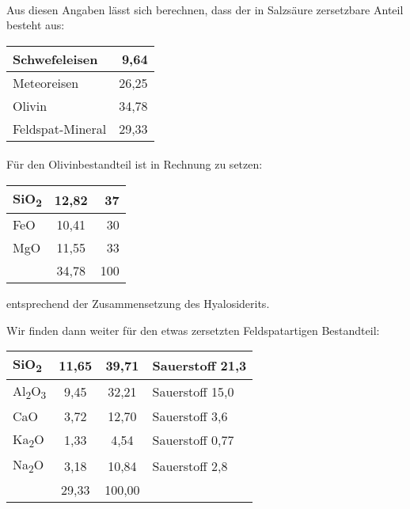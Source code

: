 \documentclass[a4paper, 11pt, oneside]{article}
\begin{document}
\paragraph{}
Aus diesen Angaben lässt sich berechnen, dass der in Salzsäure zersetzbare Anteil besteht aus:
\begin{center}
    \begin{tabular}{ |l|r| } 
    \hline
    Schwefeleisen & 9,64\\\hline
    Meteoreisen & 26,25\\\hline
    Olivin & 34,78\\\hline
    Feldspat-Mineral & 29,33\\
    \hline
    \end{tabular}
\end{center}
\paragraph{}
Für den Olivinbestandteil ist in Rechnung zu setzen:
\begin{center}
    \begin{tabular}{ |l|c|r| } 
    \hline
    SiO\textsubscript{2} & 12,82 & 37\\\hline
    FeO & 10,41 & 30\\\hline
    MgO & 11,55 & 33\\\hline
    & 34,78 & 100\\
    \hline
    \end{tabular}
\end{center}
entsprechend der Zusammensetzung des Hyalosiderits.

Wir finden dann weiter für den etwas zersetzten Feldspatartigen Bestandteil:
\begin{center}
    \begin{tabular}{ |l|c|c|l| } 
    \hline
    SiO\textsubscript{2} & 11,65 & 39,71 & Sauerstoff 21,3\\\hline
    Al\textsubscript{2}O\textsubscript{3} & 9,45 & 32,21 & Sauerstoff 15,0\\\hline
    CaO & 3,72 & 12,70 & Sauerstoff 3,6\\\hline
    Ka\textsubscript{2}O & 1,33 & 4,54 & Sauerstoff 0,77\\\hline
    Na\textsubscript{2}O & 3,18 & 10,84 & Sauerstoff 2,8\\\hline
    & 29,33 & 100,00\\
    \hline
    \end{tabular}
\end{center}
\end{document}
